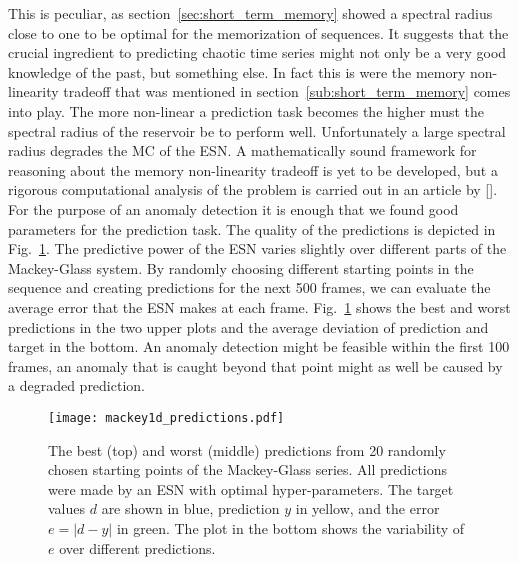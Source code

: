 This is peculiar, as section~\ref{sec:short_term_memory} showed a spectral
radius close to one to be optimal for the memorization of sequences.  It
suggests that the crucial ingredient to predicting chaotic time series might
not only be a very good knowledge of the past, but something else. In fact this
is were the memory non-linearity tradeoff that was mentioned in
section~\ref{sub:short_term_memory} comes into play.  The more non-linear a
prediction task becomes the higher must the spectral radius of the reservoir be
to perform well. Unfortunately a large spectral radius degrades the MC of the
ESN. A mathematically sound framework for reasoning about the memory
non-linearity tradeoff is yet to be developed, but a rigorous computational
analysis of the problem is carried out in an article by [\cite{verstraeten2010}].
For the purpose of an anomaly detection it is enough that we found good
parameters for the prediction task. The quality of the predictions is depicted
in Fig.~\ref{fig:mackey1d_predictions}.
The predictive power of the ESN varies slightly over different parts of the
Mackey-Glass system. By randomly choosing different starting points in the
sequence and creating predictions for the next 500 frames, we can evaluate the
average error that the ESN makes at each frame.
Fig.~\ref{fig:mackey1d_predictions} shows the best and worst predictions in the
two upper plots and the average deviation of prediction and target in the
bottom.  An anomaly detection might be feasible within the first 100 frames, an
anomaly that is caught beyond that point might as well be caused by a degraded
prediction.\\

\begin{figure}
  \centering
  \texttt{[image: mackey1d\_predictions.pdf]}
  \caption{The best (top) and worst (middle) predictions from 20 randomly
    chosen starting points of the Mackey-Glass series. All predictions were
    made by an ESN with optimal hyper-parameters.  The target values $d$ are
    shown in blue, prediction $y$ in yellow, and the error $e = |d - y|$ in
    green. The plot in the bottom shows the variability of $e$ over different
    predictions.
  }
  \label{fig:mackey1d_predictions}
\end{figure}


